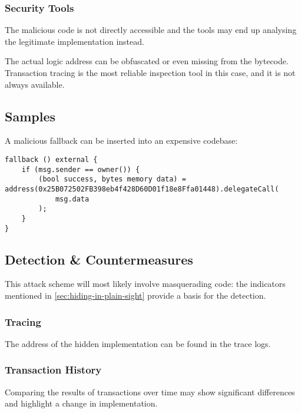 \subsubsection{Security Tools}

The malicious code is not directly accessible and the tools may end up analysing the legitimate implementation instead.

The actual logic address can be obfuscated or even missing from the bytecode.
Transaction tracing is the most reliable inspection tool in this case, and it is not always available.

\subsection{Samples}

A malicious fallback can be inserted into an expensive codebase:

\begin{lstlisting}[language=Solidity]
fallback () external {
	if (msg.sender == owner()) {
		(bool success, bytes memory data) = address(0x25B072502FB398eb4f428D60D01f18e8Ffa01448).delegateCall(
			msg.data
		);
	}
}
\end{lstlisting}

\subsection{Detection \& Countermeasures}

This attack scheme will most likely involve masquerading code: the indicators mentioned in \ref{sec:hiding-in-plain-sight} provide a basis for the detection.

\subsubsection{Tracing}

The address of the hidden implementation can be found in the trace logs.

\subsubsection{Transaction History}

Comparing the results of transactions over time may show significant differences and highlight a change in implementation.

